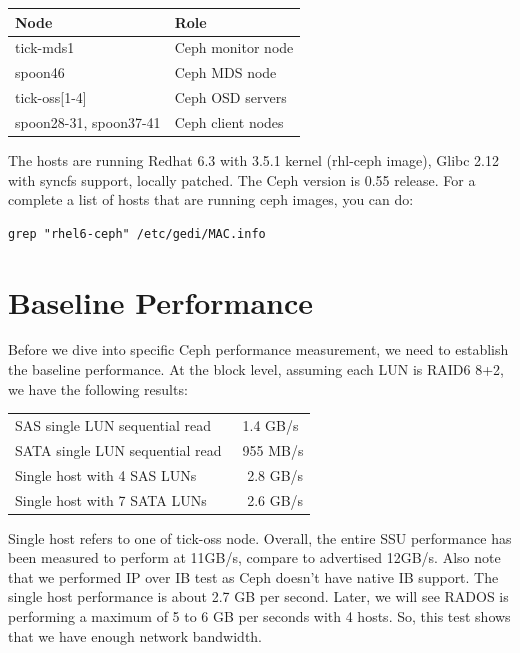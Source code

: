 \documentclass{article}
\begin{document}
\begin{table}[htb]
\centering
    \begin{tabular}{ll}
    \toprule
    Node & Role \\
    \midrule
    tick-mds1 & Ceph monitor node \\
    spoon46 & Ceph MDS node \\
    tick-oss[1-4] & Ceph OSD servers \\
    spoon28-31, spoon37-41 & Ceph client nodes \\
    \bottomrule

    \end{tabular}

\end{table}

The hosts are running Redhat 6.3 with 3.5.1 kernel (rhl-ceph image), Glibc 2.12
with syncfs support, locally patched. The Ceph version is 0.55 release. For a
complete a list of hosts that are running ceph images, you can do:

\begin{Verbatim}
grep "rhel6-ceph" /etc/gedi/MAC.info
\end{Verbatim}


\section{Baseline Performance}

Before we dive into specific Ceph performance measurement, we need to establish
the baseline performance. At the block level, assuming each LUN is RAID6 8+2,
we have the following results:

\begin{table}[htb]
\centering
\begin{tabular}{ll}
    \toprule
    SAS single LUN sequential read & ~1.4 GB/s \\
    SATA single LUN sequential read & ~955 MB/s \\
    Single host with 4 SAS LUNs & ~ 2.8 GB/s \\
    Single host with 7 SATA LUNs & ~ 2.6 GB/s \\
    \bottomrule
\end{tabular}

\end{table}

Single host refers to one of tick-oss node. Overall, the entire SSU
performance has been measured to perform at 11GB/s, compare to advertised
12GB/s. Also note that we performed IP over IB test as Ceph doesn't have
native IB support. The single host performance is about 2.7 GB per second.
Later, we will see RADOS is performing a maximum of 5 to 6 GB per seconds with
4 hosts.  So, this test shows that we have enough network bandwidth.
\end{document}
